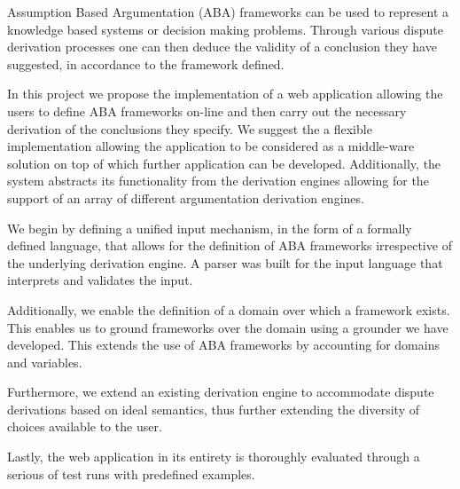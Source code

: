Assumption Based Argumentation (ABA) frameworks can be used to represent a knowledge based systems or decision making problems. Through various dispute derivation processes one can then deduce the validity of a conclusion they have suggested, in accordance to the framework defined.

In this project we propose the implementation of a web application allowing the users to define ABA frameworks on-line and then carry out the necessary derivation of the conclusions they specify. We suggest the a flexible implementation allowing the application to be considered as a middle-ware solution on top of which further application can be developed. Additionally, the system abstracts its functionality from the derivation engines allowing for the support of an array of different argumentation derivation engines.

We begin by defining a unified input mechanism, in the form of a formally defined language, that allows for the definition of ABA frameworks irrespective of the underlying derivation engine. A parser was built for the input language that interprets and validates the input.

Additionally, we enable the definition of a domain over which a framework exists. This enables us to ground frameworks over the domain using a grounder we have developed. This extends the use of ABA frameworks by accounting for domains and variables.

Furthermore, we extend an existing derivation engine to accommodate dispute derivations based on ideal semantics, thus further extending the diversity of choices available to the user.

Lastly, the web application in its entirety is thoroughly evaluated through a serious of test runs with predefined examples.